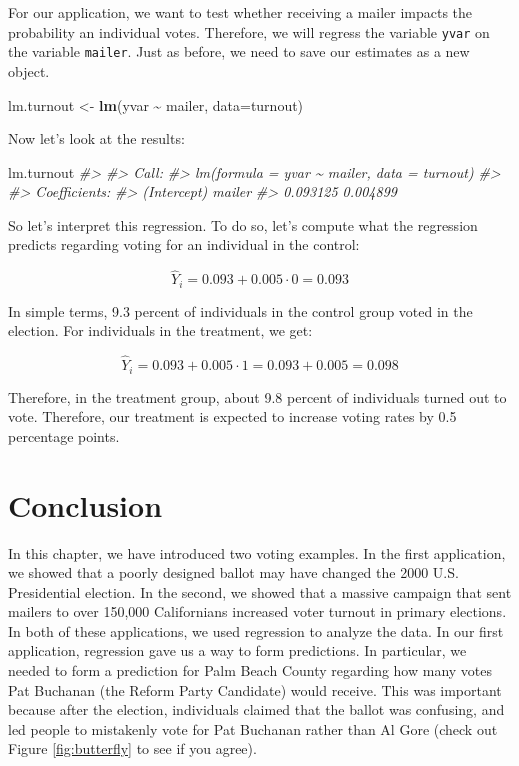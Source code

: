 \documentclass[
]{book}
\newenvironment{Shaded}{\begin{snugshade}}{\end{snugshade}}
\newcommand{\AttributeTok}[1]{\textcolor[rgb]{0.13,0.29,0.53}{#1}}
\newcommand{\CommentTok}[1]{\textcolor[rgb]{0.56,0.35,0.01}{\textit{#1}}}
\newcommand{\FunctionTok}[1]{\textcolor[rgb]{0.13,0.29,0.53}{\textbf{#1}}}
\newcommand{\NormalTok}[1]{#1}
\newcommand{\OtherTok}[1]{\textcolor[rgb]{0.56,0.35,0.01}{#1}}
\newcommand{\SpecialCharTok}[1]{\textcolor[rgb]{0.81,0.36,0.00}{\textbf{#1}}}
\begin{document}
For our application, we want to test whether receiving a mailer impacts the probability an individual votes. Therefore, we will regress the variable \texttt{yvar} on the variable \texttt{mailer}. Just as before, we need to save our estimates as a new object.

\begin{Shaded}
\begin{Highlighting}[]
\NormalTok{lm.turnout }\OtherTok{\textless{}{-}} \FunctionTok{lm}\NormalTok{(yvar }\SpecialCharTok{\textasciitilde{}}\NormalTok{ mailer, }\AttributeTok{data=}\NormalTok{turnout)}
\end{Highlighting}
\end{Shaded}

Now let's look at the results:

\begin{Shaded}
\begin{Highlighting}[]
\NormalTok{lm.turnout}
\CommentTok{\#\textgreater{} }
\CommentTok{\#\textgreater{} Call:}
\CommentTok{\#\textgreater{} lm(formula = yvar \textasciitilde{} mailer, data = turnout)}
\CommentTok{\#\textgreater{} }
\CommentTok{\#\textgreater{} Coefficients:}
\CommentTok{\#\textgreater{} (Intercept)       mailer  }
\CommentTok{\#\textgreater{}    0.093125     0.004899}
\end{Highlighting}
\end{Shaded}

So let's interpret this regression. To do so, let's compute what the regression predicts regarding voting for an individual in the control:

\[
\hat{Y}_i = 0.093 + 0.005 \cdot 0 = 0.093
\]

In simple terms, 9.3 percent of individuals in the control group voted in the election. For individuals in the treatment, we get:

\[
\hat{Y}_i = 0.093 + 0.005 \cdot 1 = 0.093+ 0.005 = 0.098
\]

Therefore, in the treatment group, about 9.8 percent of individuals turned out to vote. Therefore, our treatment is expected to increase voting rates by 0.5 percentage points.

\section{Conclusion}\label{conclusion-7}

In this chapter, we have introduced two voting examples. In the first application, we showed that a poorly designed ballot may have changed the 2000 U.S. Presidential election. In the second, we showed that a massive campaign that sent mailers to over 150,000 Californians increased voter turnout in primary elections.
In both of these applications, we used regression to analyze the data. In our first application, regression gave us a way to form predictions. In particular, we needed to form a prediction for Palm Beach County regarding how many votes Pat Buchanan (the Reform Party Candidate) would receive. This was important because after the election, individuals claimed that the ballot was confusing, and led people to mistakenly vote for Pat Buchanan rather than Al Gore (check out Figure \ref{fig:butterfly} to see if you agree).
\end{document}
